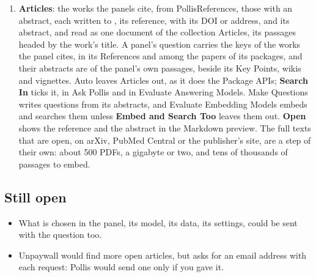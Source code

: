 \begin{enumerate}[start=8, leftmargin=*]
    Optimization and Algorithms for Decision Making. Only texts whose licence lets them be shared are in it, each an
    asset of a release of the package, downloaded the first time it is switched on, with its . Dive
    into Deep Learning is kept as its Markdown sources without its code, so that an answer from it is not led to
    Python; the others as the PDFs of their authors. \textbf{Build the Index} cuts the texts switched on into passages
    and embeds them, as a collection of Retrieval-Augmented Generation, into ,
    each passage once by each embedding model. A book of 600 pages is about a thousand passages, some 40 seconds of
    embeddings on an M4 with Metal, much longer on a computer without a graphics chip. A text's topic is found by
    search, not by a map of chapters to panels, which would not keep up with two hundred panels. Free texts that may
    not be shared, as An Introduction to Statistical Learning, The Elements of Statistical Learning and Convex
    Optimization, go into a collection of your own. Simulation is still without a text.
  \item \textbf{Articles}: the works the panels cite, from PollisReferences, those with an abstract, each written to
    , its reference, with its DOI or address, and its abstract, and read as
    one document of the collection Articles, its passages headed by the work's title. A panel's question carries the
    keys of the works the panel cites, in its References and among the papers of its packages, and their abstracts
    are of the panel's own passages, beside its Key Points, wikis and vignettes. Auto leaves Articles out, as it does
    the Package APIs; \textbf{Search In} ticks it, in Ask Pollis and in Evaluate Answering Models. Make Questions
    writes questions from its abstracts, and Evaluate Embedding Models embeds and searches them unless
    \textbf{Embed and Search Too} leaves them out.
    \textbf{Open} shows the reference and the abstract in the Markdown preview. The full texts that are open, on
    arXiv, PubMed Central or the publisher's site, are a step of their own: about 500 PDFs, a gigabyte or two, and tens
    of thousands of passages to embed.
\end{enumerate}

\subsection{Still open}
\begin{itemize}
  \item What is chosen in the panel, its model, its data, its settings, could be sent with the question too.
  \item Unpaywall would find more open articles, but asks for an email address with each request: Pollis would send
    one only if you gave it.
\end{itemize}


